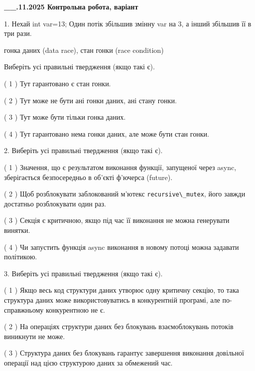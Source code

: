 \documentclass[12pt, ukrainian]{article}
\def\code#1{\Verb!#1!}
\begin{document}
\newpage
\begin {large}

\textbf{\_\_.11.2025 Контрольна робота, варіант  }\par


{
1. Нехай int var=13; Один потік збільшив змінну var на 3, а інший збільшив її в три рази.

гонка даних (data race), стан гонки (race condition)

Виберіть усі правильні твердження (якщо такі є).\par
\vspace{2mm}
( 1 ) Тут гарантовано є стан гонки.%

( 2 ) Тут може не бути ані гонки даних, ані стану гонки.%

( 3 ) Тут може бути тільки гонка даних.%

( 4 ) Тут гарантовано нема гонки даних, але може бути стан гонки.%


2. Виберіть усі правильні твердження (якщо такі є).\par
\vspace{2mm}

( 1 ) Значення, що є результатом виконання функції, запущеної через async, зберігається безпосередньо в об’єкті ф’ючерса (future).%

( 2 ) Щоб розблокувати заблокований м’ютекс \code{recursive\_mutex}, його завжди достатньо розблокувати один раз.%

( 3 ) Секція є критичною, якщо під час її виконання не можна генерувати винятки.%

( 4 ) Чи запустить функція  async виконання в новому потоці можна задавати політикою.%


3. Виберіть усі правильні твердження (якщо такі є).\par
\vspace{2mm}

( 1 ) Якщо весь код структури даних утворює одну критичну секцію, то така структура даних може використовуватись в конкурентній програмі, але по-справжньо\-му конкурентною не є.%

( 2 ) На операціях структури даних без блокувань взаємоблокувань потоків виникнути не може.%

( 3 ) Структура даних без блокувань гарантує завершення виконання довільної операції над цією структурою даних за обмежений час.%

}
\end{large}
\end{document}

